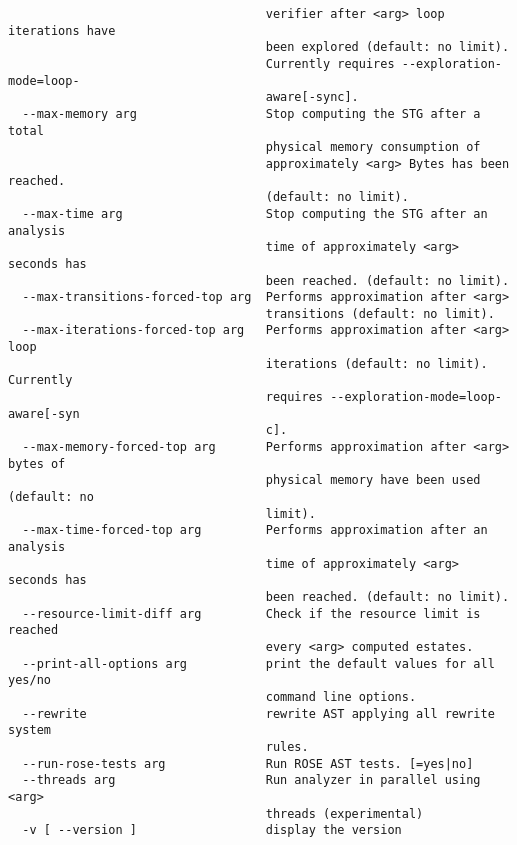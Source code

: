 \documentclass[natbib]{article}
\begin{document}
\begin{verbatim}
                                    verifier after <arg> loop iterations have 
                                    been explored (default: no limit). 
                                    Currently requires --exploration-mode=loop-
                                    aware[-sync].
  --max-memory arg                  Stop computing the STG after a total 
                                    physical memory consumption of 
                                    approximately <arg> Bytes has been reached.
                                    (default: no limit).
  --max-time arg                    Stop computing the STG after an analysis 
                                    time of approximately <arg> seconds has 
                                    been reached. (default: no limit).
  --max-transitions-forced-top arg  Performs approximation after <arg> 
                                    transitions (default: no limit).
  --max-iterations-forced-top arg   Performs approximation after <arg> loop 
                                    iterations (default: no limit). Currently 
                                    requires --exploration-mode=loop-aware[-syn
                                    c].
  --max-memory-forced-top arg       Performs approximation after <arg> bytes of
                                    physical memory have been used (default: no
                                    limit).
  --max-time-forced-top arg         Performs approximation after an analysis 
                                    time of approximately <arg> seconds has 
                                    been reached. (default: no limit).
  --resource-limit-diff arg         Check if the resource limit is reached 
                                    every <arg> computed estates.
  --print-all-options arg           print the default values for all yes/no 
                                    command line options.
  --rewrite                         rewrite AST applying all rewrite system 
                                    rules.
  --run-rose-tests arg              Run ROSE AST tests. [=yes|no]
  --threads arg                     Run analyzer in parallel using <arg> 
                                    threads (experimental)
  -v [ --version ]                  display the version
\end{verbatim}
\end{document}

